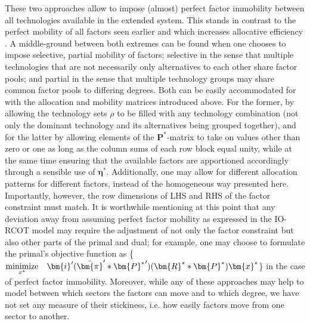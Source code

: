 These two approaches allow to impose (almost) perfect factor immobility between all technologies available in the extended system. This stands in contrast to the perfect mobility of all factors seen earlier and which increases allocative efficiency \parencite{amores_2014}. A middle-ground between both extremes can be found when one chooses to impose selective, partial mobility of factors; selective in the sense that multiple technologies that are not necessarily only alternatives to each other share factor pools; and partial in the sense that multiple technology groups may share common factor pools to differing degrees. Both can be easily accommodated for with the allocation and mobility matrices introduced above. For the former, by allowing the technology sets $\rho$ to be filled with any technology combination (not only the dominant technology and its alternatives being grouped together), and for the latter by allowing elements of the $\bm{P}^{*}$-matrix to take on values other than zero or one as long as the column sums of each row block equal unity, while at the same time ensuring that the available factors are apportioned accordingly through a sensible use of $\bm{\eta}^{*}$. Additionally, one may allow for different allocation patterns for different factors, instead of the homogeneous way presented here. Importantly, however, the row dimensions of LHS and RHS of the factor constraint must match. It is worthwhile mentioning at this point that any deviation away from assuming perfect factor mobility as expressed in the IO-RCOT model may require the adjustment of not only the factor constraint but also other parts of the primal and dual; for example, one may choose to formulate the primal's objective function as \{$\underset{x^{*}}{\rm minimize} \quad \bm{i}' (\Bar{\bm{\pi}}' \ast {\bm{P}^{*}}^{\prime}) (\bm{R}^{*} \ast \bm{P}^{*}) \bm{x}^{*} $\} in the case of perfect factor immobility. Moreover, while any of these approaches may help to model between which sectors the factors can move and to which degree, we have not set any measure of their stickiness, i.e. how easily factors move from one sector to another.\footnotemark{}


